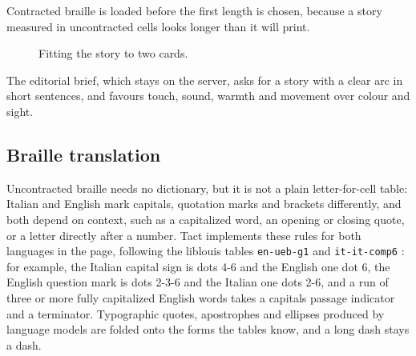 \documentclass[conference]{IEEEtran}
\begin{document}
Contracted braille is loaded before the first length is chosen, because a story measured in uncontracted cells looks longer than it will print.

\begin{figure}[t]
\centering
{}
\caption{Fitting the story to two cards.}
\label{fig:loop}
\end{figure}

The editorial brief, which stays on the server, asks for a story with a clear arc in short sentences, and favours touch, sound, warmth and movement over colour and sight.

\subsection{Braille translation}\label{sec:braille}

Uncontracted braille needs no dictionary, but it is not a plain letter-for-cell table: Italian and English mark capitals, quotation marks and brackets differently, and both depend on context, such as a capitalized word, an opening or closing quote, or a letter directly after a number. Tact implements these rules for both languages in the page, following the liblouis tables \texttt{en-ueb-g1} and \texttt{it-it-comp6} \cite{liblouis}: for example, the Italian capital sign is dots 4-6 and the English one dot 6, the English question mark is dots 2-3-6 and the Italian one dots 2-6, and a run of three or more fully capitalized English words takes a capitals passage indicator and a terminator. Typographic quotes, apostrophes and ellipses produced by language models are folded onto the forms the tables know, and a long dash stays a dash.
\end{document}
